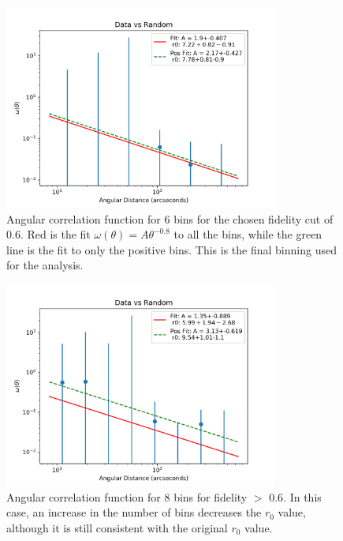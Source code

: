 \begin{figure}[!tbp]
\centering \includegraphics[width=90mm]{Data_vs_Random_10000_bin6_sn0_6_NFalse.png}
\caption{Angular correlation function for 6 bins for the chosen fidelity cut of 0.6. Red is the fit $\omega(\theta) = A\theta^{-0.8}$ to all the bins, while the green line is the fit to only the positive bins. This is the final binning used for the analysis. }
\label{fig:Angular_binnings}
\end{figure}

\begin{figure}[!tbp]
\centering \includegraphics[width=90mm]{Data_vs_Random_10000_bin8_sn0_6_NFalse.png}
\caption{Angular correlation function for 8 bins  for fidelity $>$ 0.6. In this case, an increase in the number of bins decreases the $r_0$ value, although it is still consistent with the original $r_0$ value.}
\label{fig:Angular_bin_8}
\end{figure}

